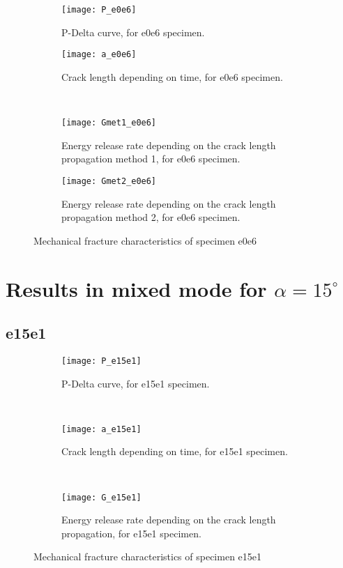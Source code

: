 \begin{figure}[H]
	\centering
	\begin{subfigure}{0.48\linewidth}
		\centering
		\texttt{[image: P\_e0e6]}
		\decoRule
		\caption{P-Delta curve, for e0e6 specimen.}
		\label{fig:P_e0e6}
	\end{subfigure}
	\hfill 
	\begin{subfigure}{0.48\linewidth}
		\centering
		\texttt{[image: a\_e0e6]}
		\decoRule
		\caption{Crack length depending on time, for e0e6 specimen.}
		\label{fig:a_e0e6}
	\end{subfigure}
	\hfill\\
	\begin{subfigure}{0.48\linewidth}
		\centering
		\texttt{[image: Gmet1\_e0e6]}
		\decoRule
		\caption{Energy release rate depending on the crack length propagation method 1, for e0e6 specimen.}
		\label{fig:Gmet1_e0e6}
	\end{subfigure}
	\hfill 
	\begin{subfigure}{0.48\linewidth}
		\centering
		\texttt{[image: Gmet2\_e0e6]}
		\decoRule
		\caption{Energy release rate depending on the crack length propagation method 2, for e0e6 specimen.}
		\label{fig:Gmet2_e0e6}
	\end{subfigure}
	\caption{Mechanical fracture characteristics of specimen e0e6}
	\label{E1o_a}
\end{figure}



\section{Results in mixed mode for $\alpha=15 ^\circ$}

\subsection{e15e1}

\begin{figure}[H]
	\centering
\begin{subfigure}{0.48\linewidth}
	\centering
	\texttt{[image: P\_e15e1]}
	\decoRule
	\caption{P-Delta curve, for e15e1 specimen.}
	\label{fig:P_e15e1}
\end{subfigure}
\hfill \\
\begin{subfigure}{0.48\linewidth}
	\centering
	\texttt{[image: a\_e15e1]}
	\decoRule
	\caption{Crack length depending on time, for e15e1 specimen.}
	\label{fig:a_e15e1}
\end{subfigure}
\hfill\\
\begin{subfigure}{0.48\linewidth}
	\centering
	\texttt{[image: G\_e15e1]}
	\decoRule
	\caption{Energy release rate depending on the crack length propagation, for e15e1 specimen.}
	\label{fig:G_e15e1}
\end{subfigure}
\caption{Mechanical fracture characteristics of specimen e15e1}
\label{E1o_a}
\end{figure}


